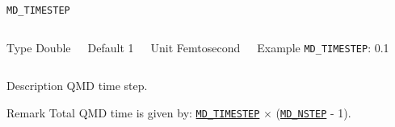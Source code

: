 \begin{frame}[allowframebreaks]{\texttt{MD\_TIMESTEP}} \label{MD_TIMESTEP}
\vspace*{-12pt}
\begin{columns}
\begin{block}{Type}
Double
\end{block}

\begin{block}{Default}
1
\end{block}

\begin{block}{Unit}
Femtosecond
\end{block}

\begin{block}{Example}
\texttt{MD\_TIMESTEP}: 0.1
\end{block}
\end{columns}

\begin{block}{Description}
QMD time step. 
\end{block}

\begin{block}{Remark}
Total QMD time is given by:  \hyperlink{MD_TIMESTEP}{\texttt{MD\_TIMESTEP}} $\times$ (\hyperlink{MD_NSTEP}{\texttt{MD\_NSTEP}} - 1).
\end{block}

\end{frame}


